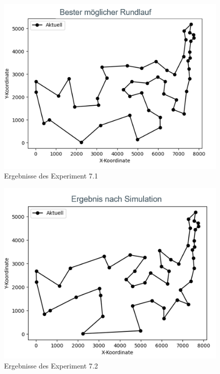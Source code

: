 \begin{figure}[H]
\centering
\includegraphics[width=1\textwidth]{img/Vortrag/experiment7_1.png}
\caption{Ergebnisse des Experiment 7.1}
\label{fig:experiment71}
\end{figure}
\begin{figure}[H]
\centering
\includegraphics[width=1\textwidth]{img/Vortrag/experiment7_2.png}
\caption{Ergebnisse des Experiment 7.2}
\label{fig:experiment72}
\end{figure}
